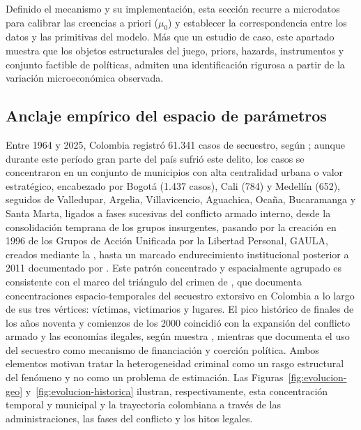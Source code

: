 \documentclass[pdflatex,sn-mathphys-ay]{sn-jnl}
\theoremstyle{thmstyleone}
\theoremstyle{thmstyletwo}
\theoremstyle{thmstylethree}
\newcommand{\1}{\mathbf{1}}
\begin{document}
Definido el mecanismo y su implementación, esta sección recurre a microdatos para calibrar las creencias a priori ($\mu_0$) y establecer la correspondencia entre los datos y las primitivas del modelo. Más que un estudio de caso, este apartado muestra que los objetos estructurales del juego, priors, hazards, instrumentos y conjunto factible de políticas, admiten una identificación rigurosa a partir de la variación microeconómica observada.

\subsection{Anclaje empírico del espacio de parámetros}\label{sec:institutional}

Entre 1964 y 2025, Colombia registró 61.341 casos de secuestro, según \citet{cnmh_datos}; aunque durante este período gran parte del país sufrió este delito, los casos se concentraron en un conjunto de municipios con alta centralidad urbana o valor estratégico, encabezado por Bogotá (1.437 casos), Cali (784) y Medellín (652), seguidos de Valledupar, Argelia, Villavicencio, Aguachica, Ocaña, Bucaramanga y Santa Marta, ligados a fases sucesivas del conflicto armado interno, desde la consolidación temprana de los grupos insurgentes, pasando por la creación en 1996 de los Grupos de Acción Unificada por la Libertad Personal, GAULA, creados mediante la \citet{ley282_1996}, hasta un marcado endurecimiento institucional posterior a 2011 documentado por \citet{CNMH2013}. Este patrón concentrado y espacialmente agrupado es consistente con el marco del triángulo del crimen de \citet{Pires2014}, que documenta concentraciones espacio-temporales del secuestro extorsivo en Colombia a lo largo de sus tres vértices: víctimas, victimarios y lugares. El pico histórico de finales de los años noventa y comienzos de los 2000 coincidió con la expansión del conflicto armado y las economías ilegales, según muestra \citet{pinto2004}, mientras que \citet{Zarate2007} documenta el uso del secuestro como mecanismo de financiación y coerción política. Ambos elementos motivan tratar la heterogeneidad criminal como un rasgo estructural del fenómeno y no como un problema de estimación. Las Figuras~\ref{fig:evolucion-geo} y~\ref{fig:evolucion-historica} ilustran, respectivamente, esta concentración temporal y municipal y la trayectoria colombiana a través de las administraciones, las fases del conflicto y los hitos legales.
\end{document}
